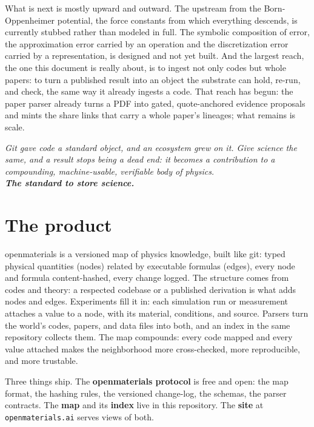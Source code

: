 \documentclass[11pt,a4paper]{article}
\begin{document}
What is next is mostly upward and outward. The upstream from the
Born-Oppenheimer potential, the force constants from which everything descends, is
currently stubbed rather than modeled in full. The symbolic composition of error,
the approximation error carried by an operation and the discretization error
carried by a representation, is designed and not yet built. And the largest reach,
the one this document is really about, is to ingest not only codes but whole
papers: to turn a published result into an object the substrate can hold, re-run,
and check, the same way it already ingests a code. That reach has begun: the
paper parser already turns a PDF into gated, quote-anchored evidence proposals
and mints the share links that carry a whole paper's lineages; what remains is
scale.

\bigskip
\begin{center}
\color{abstrcol}\itshape
Git gave code a standard object, and an ecosystem grew on it. Give science the
same, and a result stops being a dead end: it becomes a contribution to a
compounding, machine-usable, verifiable body of physics.\\[0.5em]
\normalfont\bfseries The standard to store science.
\end{center}

\part{The product}
\label{part:product}

\noindent
openmaterials is a versioned map of physics knowledge, built like git: typed
physical quantities (nodes) related by executable formulas (edges), every
node and formula content-hashed, every change logged. The structure comes from codes and
theory: a respected codebase or a published derivation is what adds nodes and
edges. Experiments fill it in: each simulation run or measurement attaches a
value to a node, with its material, conditions, and source. Parsers turn the
world's codes, papers, and data files into both, and an index in the same
repository collects them. The map compounds: every code mapped and every value
attached makes the neighborhood more cross-checked, more reproducible, and more
trustable.

Three things ship. The \textbf{openmaterials protocol} is free and open: the map
format, the hashing rules, the versioned change-log, the schemas, the parser
contracts. The \textbf{map} and its \textbf{index} live in this repository. The
\textbf{site} at \texttt{openmaterials.ai} serves views of both.
\end{document}
